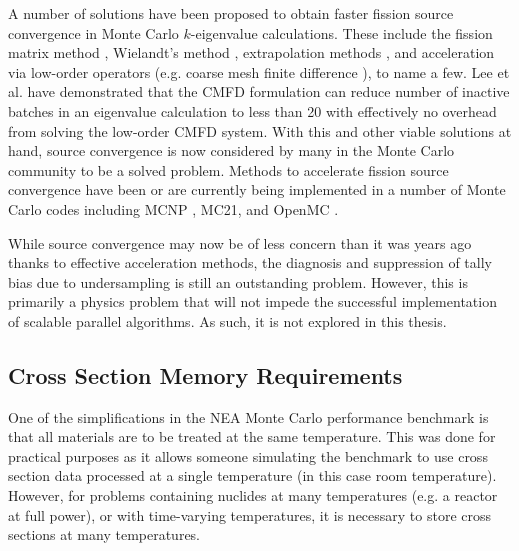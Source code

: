A number of solutions have been proposed to obtain faster fission source
convergence in Monte Carlo $k$-eigenvalue calculations. These include the
fission matrix method \cite{ane-dufek-2007, lanl-carney-2012}, Wielandt's method
\cite{jnst-yamamoto-2004, mc-brown-2007}, extrapolation methods
\cite{mc-toth-2007-1, mc-toth-2007-2}, and acceleration via low-order operators
(e.g. coarse mesh finite difference \cite{physor-lee-2010, sna-lee-2010,
  physor-lee-2012}), to name a few. Lee et al. \cite{physor-lee-2012} have
demonstrated that the CMFD formulation can reduce number of inactive batches in
an eigenvalue calculation to less than 20 with effectively no overhead from
solving the low-order CMFD system. With this and other viable solutions at hand,
source convergence is now considered by many in the Monte Carlo community to be
a solved problem. Methods to accelerate fission source convergence have been or
are currently being implemented in a number of Monte Carlo codes including MCNP
\cite{lanl-young-2011}, MC21, and OpenMC \cite{mc-romano-2013}.

While source convergence may now be of less concern than it was years ago thanks
to effective acceleration methods, the diagnosis and suppression of tally bias
due to undersampling \cite{nse-ueki-2005, nse-ueki-2008, jnst-ueki-2011} is
still an outstanding problem. However, this is primarily a physics problem that
will not impede the successful implementation of scalable parallel
algorithms. As such, it is not explored in this thesis.

\subsection{Cross Section Memory Requirements}

One of the simplifications in the NEA Monte Carlo performance benchmark is that
all materials are to be treated at the same temperature. This was done for
practical purposes as it allows someone simulating the benchmark to use cross
section data processed at a single temperature (in this case room
temperature). However, for problems containing nuclides at many temperatures
(e.g. a reactor at full power), or with time-varying temperatures, it is
necessary to store cross sections at many temperatures.

